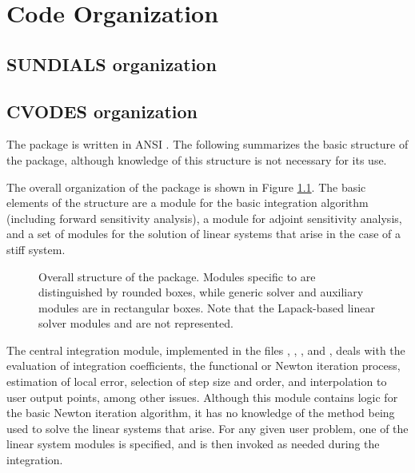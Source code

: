 \chapter{Code Organization}\label{s:organization}

\section{SUNDIALS organization}\label{ss:sun_org}


\section{CVODES organization}\label{ss:cvodes_org}

The {\cvodes} package is written in ANSI {\C}. The following
summarizes the basic structure of the package, although knowledge
of this structure is not necessary for its use.

The overall organization of the {\cvodes} package is shown in Figure
\ref{f:cvsorg}.  The basic elements of the structure are a module for
the basic integration algorithm (including forward sensitivity analysis),
a module for adjoint sensitivity analysis, and a set of modules for the solution
of linear systems that arise in the case of a stiff system.  
\begin{figure}
{\centerline{}}
\caption [Overall structure of the CVODES package]
{Overall structure of the {\cvodes} package.
  Modules specific to {\cvodes} are distinguished by rounded boxes, while 
  generic solver and auxiliary modules are in rectangular boxes. Note that 
  the Lapack-based linear solver modules {\cvlapdense} and {\cvlapband}
  are not represented.}
\label{f:cvsorg}
\end{figure}
The central integration module, implemented in the files ,
, , and , deals 
with the evaluation of integration coefficients,
the functional or Newton iteration process, estimation of local error,
selection of step size and order, and interpolation to user output
points, among other issues.  Although this module contains logic for
the basic Newton iteration algorithm, it has no knowledge of the
method being used to solve the linear systems that arise.  For any
given user problem, one of the linear system modules is specified, and
is then invoked as needed during the integration. 

